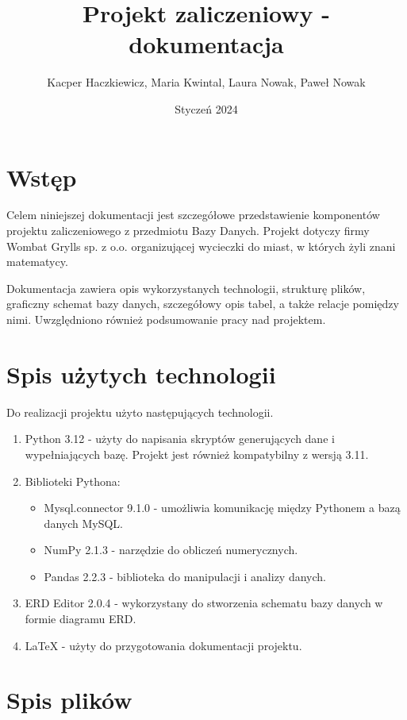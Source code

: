 \documentclass{article}
\author{Kacper Haczkiewicz, Maria Kwintal, Laura Nowak, Paweł Nowak}
\title{\textbf{Projekt zaliczeniowy - dokumentacja}}
\date{Styczeń 2024}
\begin{document}
	
	\maketitle
	
	\section{Wstęp}
	
	Celem niniejszej dokumentacji jest szczegółowe przedstawienie komponentów projektu zaliczeniowego z przedmiotu Bazy Danych. Projekt dotyczy firmy Wombat Grylls sp. z o.o. organizującej wycieczki do miast, w których żyli znani matematycy.
	
	Dokumentacja zawiera opis wykorzystanych technologii, strukturę plików, graficzny schemat bazy danych, szczegółowy opis tabel, a także relacje pomiędzy nimi. Uwzględniono również podsumowanie pracy nad projektem.
	
	\section{Spis użytych technologii}
	
	Do realizacji projektu użyto następujących technologii.
	\begin{enumerate}
		\item Python 3.12 - użyty do napisania skryptów generujących dane i wypełniających bazę. Projekt jest również kompatybilny z wersją 3.11.
		\item Biblioteki Pythona:
		\begin{itemize}
			\item Mysql.connector 9.1.0 - umożliwia komunikację między Pythonem a bazą danych MySQL.
			\item NumPy 2.1.3 - narzędzie do obliczeń numerycznych.
			\item Pandas 2.2.3 - biblioteka do manipulacji i analizy danych.
		\end{itemize}
		\item ERD Editor 2.0.4 - wykorzystany do stworzenia schematu bazy danych w formie diagramu ERD.
		\item LaTeX - użyty do przygotowania dokumentacji projektu.
	\end{enumerate}
	
	\section{Spis plików}
	
\end{document}
